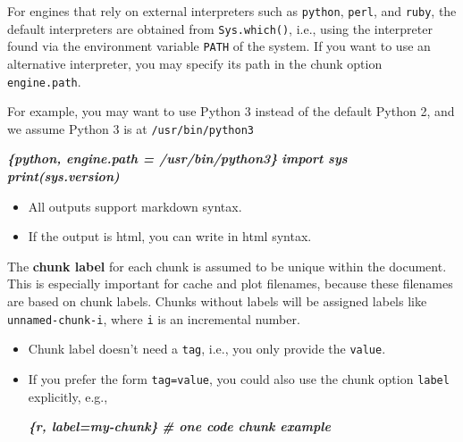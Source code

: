\documentclass[
  a4paper,
  twoside,
  openright]{book}
\newenvironment{Shaded}{\begin{snugshade}}{\end{snugshade}}
\newcommand{\InformationTok}[1]{\textcolor[rgb]{0.56,0.35,0.01}{\textbf{\textit{#1}}}}
\providecommand{\tightlist}{%
  \setlength{\itemsep}{0pt}\setlength{\parskip}{0pt}}
\theoremstyle{definition}
\theoremstyle{definition}
\theoremstyle{definition}
\theoremstyle{definition}
\theoremstyle{remark}
\begin{document}
For engines that rely on external interpreters such as \texttt{python}, \texttt{perl}, and \texttt{ruby}, the default interpreters are obtained from \texttt{Sys.which()}, i.e., using the interpreter found via the environment variable \texttt{PATH} of the system. If you want to use an alternative interpreter, you may specify its path in the chunk option \texttt{engine.path}.

For example, you may want to use Python 3 instead of the default Python 2, and we assume Python 3 is at \texttt{/usr/bin/python3}

\begin{Shaded}
\begin{Highlighting}[]
\InformationTok{\textasciigrave{}\textasciigrave{}\textasciigrave{}\{python, engine.path = \textquotesingle{}/usr/bin/python3\textquotesingle{}\}}
\InformationTok{import sys}
\InformationTok{print(sys.version)}
\InformationTok{\textasciigrave{}\textasciigrave{}\textasciigrave{}}
\end{Highlighting}
\end{Shaded}

\begin{itemize}
\tightlist
\item
  All outputs support markdown syntax.
\item
  If the output is html, you can write in html syntax.
\end{itemize}

The \textbf{chunk label} for each chunk is assumed to be unique within the document. This is especially important for cache and plot filenames, because these filenames are based on chunk labels. Chunks without labels will be assigned labels like \texttt{unnamed-chunk-i}, where \texttt{i} is an incremental number.

\begin{itemize}
\item
  Chunk label doesn't need a \texttt{tag}, i.e., you only provide the \texttt{value}.
\item
  If you prefer the form \texttt{tag=value}, you could also use the chunk option \texttt{label} explicitly, e.g.,

\begin{Shaded}
\begin{Highlighting}[]
\InformationTok{\textasciigrave{}\textasciigrave{}\textasciigrave{}\{r, label=\textquotesingle{}my{-}chunk\textquotesingle{}\}}
\InformationTok{\# one code chunk example}
\InformationTok{\textasciigrave{}\textasciigrave{}\textasciigrave{}}
\end{Highlighting}
\end{Shaded}
\end{itemize}
\end{document}
